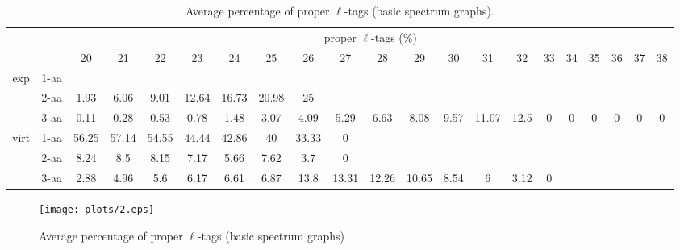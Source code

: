 \documentclass{article}
\begin{document}
\begin{landscape}
\begin{table}[h]\tiny
\vspace{3mm}
{\centering
\begin{center}
\begin{tabular}{|c|l|c|c|c|c|c|c|c|c|c|c|c|c|c|c|c|c|c|c|c|}
  \hline
  \multicolumn{2}{|c|}{ } & \multicolumn{ 19 }{|c|}{ proper $\ell$-tags (\%)} \\
  \cline{3- 21}
  \multicolumn{2}{|c|}{ }  & 20 & 21 & 22 & 23 & 24 & 25 & 26 & 27 & 28 & 29 & 30 & 31 & 32 & 33 & 34 & 35 & 36 & 37 & 38\\
  \hline
  \multirow{3}{*}{exp}
&  1-aa  &  &  &  &  &  &  &  &  &  &  &  &  &  &  &  &  &  &  & \\
&  2-aa  & 1.93 & 6.06 & 9.01 & 12.64 & 16.73 & 20.98 & 25 &  &  &  &  &  &  &  &  &  &  &  & \\
&  3-aa  & 0.11 & 0.28 & 0.53 & 0.78 & 1.48 & 3.07 & 4.09 & 5.29 & 6.63 & 8.08 & 9.57 & 11.07 & 12.5 & 0 & 0 & 0 & 0 & 0 & 0\\
 \hline
  \multirow{3}{*}{virt} 
&  1-aa  & 56.25 & 57.14 & 54.55 & 44.44 & 42.86 & 40 & 33.33 & 0 &  &  &  &  &  &  &  &  &  &  & \\
&  2-aa  & 8.24 & 8.5 & 8.15 & 7.17 & 5.66 & 7.62 & 3.7 & 0 &  &  &  &  &  &  &  &  &  &  & \\
&  3-aa  & 2.88 & 4.96 & 5.6 & 6.17 & 6.61 & 6.87 & 13.8 & 13.31 & 12.26 & 10.65 & 8.54 & 6 & 3.12 & 0 &  &  &  &  & \\
 \hline
\end{tabular}
\end{center}
\par}
\centering
\caption{ Average percentage of proper $\ell$-tags (basic spectrum graphs).}
\label{table:table2}
\vspace{3mm}
\end{table}

\end{landscape}

\begin{figure}
  \begin{center}
\texttt{[image: plots/2.eps]}

\end{center}
\caption{Average percentage of proper $\ell$-tags (basic spectrum graphs)}
  \label{fig:LABEL}
\end{figure}
\end{document}

